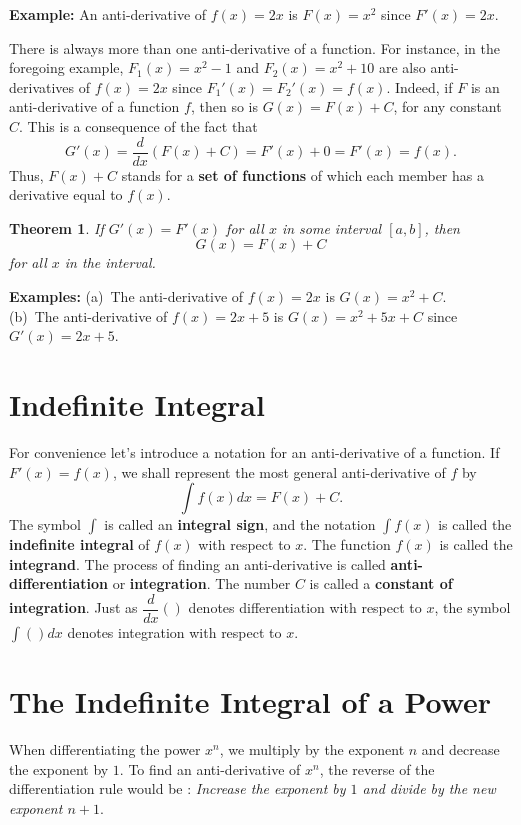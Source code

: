 \documentclass[titlepage,a4paper,12pt]{report}
\newtheorem{theorem}{Theorem}[section]
\begin{document}
\noindent \textbf{Example:} An anti-derivative of $f(x)=2x$ is $F(x)=x^2$ since $F'(x)=2x$.

\noindent There is always more than one anti-derivative of a function. For instance, in the foregoing example, $F_1(x)=x^2-1$ and $F_2(x)=x^2+10$ are also anti-derivatives of $f(x)=2x$ since $F_1'(x)=F_2'(x)=f(x)$. Indeed, if $F$ is an anti-derivative of a function $f$, then so is $G(x)=F(x)+C$, for any constant $C$. This is a consequence of the fact that 
\begin{equation*}
G'(x)=\dfrac{d}{dx}(F(x)+C)=F'(x)+0=F'(x)=f(x).
\end{equation*}
Thus, $F(x)+C$ stands for a \textbf{set of functions} of which each member has a derivative equal to $f(x)$.
\begin{theorem}
If $G'(x)=F'(x)$ for all $x$ in some interval $[a,b]$, then 
\begin{equation*}
G(x)=F(x)+C
\end{equation*}
for all $x$ in the interval.
\end{theorem}

\noindent \textbf{Examples:} (a)\, The anti-derivative of $f(x)=2x$ is $G(x)=x^2+C$.\\
(b)\, The anti-derivative of $f(x)=2x+5$ is $G(x)=x^2+5x+C$ since $G'(x)=2x+5$.

\section{Indefinite Integral }
For convenience let's introduce a notation for an anti-derivative of a function. If $F'(x)=f(x)$, we shall represent the most general anti-derivative of $f$ by 
\begin{equation*}
\int f(x) dx =F(x) +C.
\end{equation*}
The symbol $\displaystyle \int$ is called an \textbf{integral sign}, and the notation $\displaystyle \int f(x)$ is called the \textbf{indefinite integral} of $f(x)$ with respect to $x$. The function $f(x)$ is called the \textbf{integrand}. The process of finding an anti-derivative is called \textbf{anti-differentiation} or \textbf{integration}. The number $C$ is called a \textbf{constant of integration}. Just as $\dfrac{d}{dx} ()$ denotes differentiation with respect to $x$, the symbol $\displaystyle \int ()dx$ denotes integration with respect to $x$.

\section{The Indefinite Integral of a Power}
When differentiating the power $x^n$, we multiply by the exponent $n$ and decrease the exponent by $1$. To find an anti-derivative of $x^n$, the reverse of the differentiation rule would be : \textit{Increase the exponent by $1$ and divide by the new exponent $n+1$}.
\end{document}

